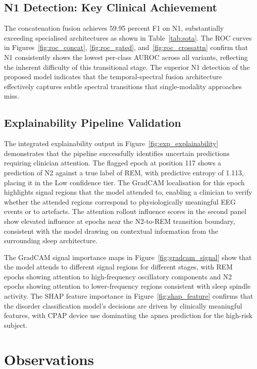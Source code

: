 \subsection{N1 Detection: Key Clinical Achievement}

The concatenation fusion achieves 59.95 percent F1 on N1, substantially exceeding specialised architectures as shown in Table~\ref{tab:sota}. The ROC curves in Figures~\ref{fig:roc_concat}, \ref{fig:roc_gated}, and~\ref{fig:roc_crossattn} confirm that N1 consistently shows the lowest per-class AUROC across all variants, reflecting the inherent difficulty of this transitional stage. The superior N1 detection of the proposed model indicates that the temporal-spectral fusion architecture effectively captures subtle spectral transitions that single-modality approaches miss.

\subsection{Explainability Pipeline Validation}

The integrated explainability output in Figure~\ref{fig:exp_explainability} demonstrates that the pipeline successfully identifies uncertain predictions requiring clinician attention. The flagged epoch at position 117 shows a prediction of N2 against a true label of REM, with predictive entropy of 1.113, placing it in the Low confidence tier. The GradCAM localisation for this epoch highlights signal regions that the model attended to, enabling a clinician to verify whether the attended regions correspond to physiologically meaningful EEG events or to artefacts. The attention rollout influence scores in the second panel show elevated influence at epochs near the N2-to-REM transition boundary, consistent with the model drawing on contextual information from the surrounding sleep architecture.

The GradCAM signal importance maps in Figure~\ref{fig:gradcam_signal} show that the model attends to different signal regions for different stages, with REM epochs showing attention to high-frequency oscillatory components and N2 epochs showing attention to lower-frequency regions consistent with sleep spindle activity. The SHAP feature importance in Figure~\ref{fig:shap_feature} confirms that the disorder classification model's decisions are driven by clinically meaningful features, with CPAP device use dominating the apnea prediction for the high-risk subject.

\section{Observations}

